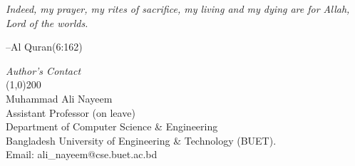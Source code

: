  \vspace{40cm}
 	 \textit{\Large Indeed, my prayer, my rites of sacrifice, my living and my dying are for Allah, Lord of the worlds.}  \begin{flushright}\Large --Al Quran(6:162)\\\end{flushright}
 \vspace{11cm}
 \begin{flushright}
 \textit{\Large \sc Author's Contact}\\
 \line(1,0){200}\\
 Muhammad Ali Nayeem\\
 Assistant Professor (on leave)\\
 Department of Computer Science \& Engineering \\
 Bangladesh University of Engineering \& Technology (BUET).\\
 Email:
 {ali\_nayeem@cse.buet.ac.bd}
 \end{flushright}
 \newpage
 \vspace*{-3.5cm}
